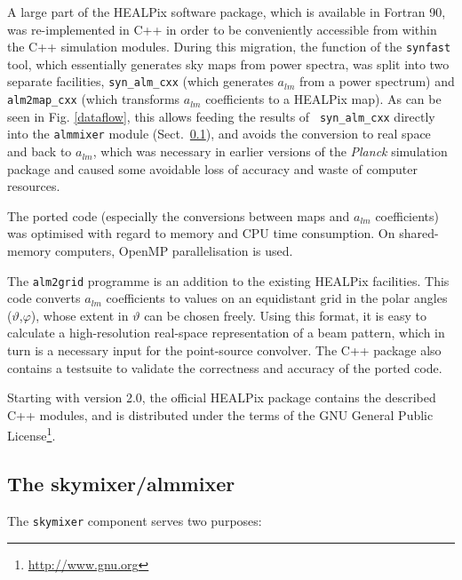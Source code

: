 \documentclass{aa}
\begin{document}
A large part of the HEALPix software package, which is available in
Fortran 90, was re-implemented in C++ in order to be conveniently
accessible from within the C++ simulation modules. During this migration,
the function of the {\tt synfast} tool, which essentially
generates sky maps from power spectra, was split into two separate
facilities, {\tt syn\_alm\_cxx} (which generates $a_{lm}$
from a power spectrum) and {\tt alm2map\_cxx}
(which transforms $a_{lm}$ coefficients to a HEALPix map). As can be
seen in Fig. \ref{dataflow}, this allows feeding the results of {\tt
syn\_alm\_cxx} directly into the {\tt almmixer} module (Sect.\
\ref{mixers}), and avoids the conversion to real space and back to
$a_{lm}$, which was necessary in earlier versions of the \emph{Planck}
simulation package and caused some avoidable loss of accuracy and
waste of computer resources.

The ported code (especially the conversions between maps and $a_{lm}$
coefficients) was optimised with regard to memory and CPU time
consumption. On shared-memory computers, OpenMP parallelisation is
used.

The {\tt alm2grid} programme is an addition to the existing HEALPix
facilities. This code converts $a_{lm}$ coefficients to values on an
equidistant grid in the polar angles ($\vartheta$,$\varphi$), whose
extent in $\vartheta$ can be chosen freely. Using this format, it is
easy to calculate a high-resolution real-space representation of a
beam pattern, which in turn is a necessary input for the point-source
convolver.
The C++ package also contains a testsuite to validate the correctness and
accuracy of the ported code.

Starting with version 2.0, the official HEALPix package contains the
described C++ modules, and is distributed under the terms of the GNU General
Public License\footnote{\href{http://www.gnu.org}{http://www.gnu.org}}.

\subsection {The skymixer/almmixer}
\label {mixers}

The {\tt skymixer} component serves two purposes:
\end{document}
